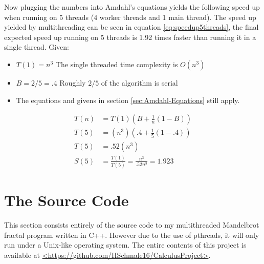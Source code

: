 \documentclass[10pt,oneside,letterpaper]{article}
\begin{document}
Now plugging the numbers into Amdahl's equations yields the following speed up
when running on 5 threads (4 worker threads and 1 main thread). The speed up
yielded by multithreading can be seen in equation \eqref{eq:speedup5threads},
the final expected speed up running on 5 threads is 1.92 times faster than running
it in a single thread.
Given:
\begin{itemize}
    \item $T(1) = n^3$ The single threaded time complexity is $O(n^3)$
    \item $B = 2/5 = .4$ Roughly $2/5$ of the algorithm is serial
    \item The equations and givens in section \ref{sec:Amdahl-Equations}
        still apply.
\end{itemize}

\begin{equation} \label{eq:speedup5threads}
    \begin{align*}
        T(n)&= T(1)(B + \frac{1}{n}(1-B))\\
        T(5)&= (n^3)(.4 + \frac{1}{5}(1-.4))\\
        T(5)&= .52(n^3)\\
        S(5)&= \frac{T(1)}{T(5)} = \frac{n^3}{.52n^3} = 1.923
    \end{align*}
\end{equation}

\section{The Source Code}
This section consists entirely of the source code to my multithreaded
Mandelbrot fractal program written in C++. However due to the use of
pthreads, it will only run under a Unix-like operating system. The 
entire contents of this project is available at 
\url{<https://github.com/HSchmale16/CalculusProject>}.

\end{document}
